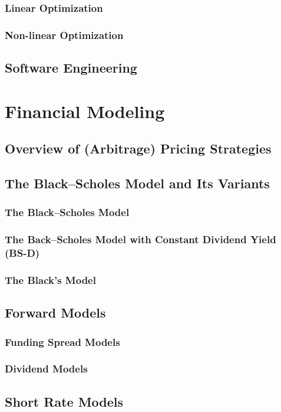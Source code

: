 \subsection{Linear Optimization}
\subsection{Non-linear Optimization}
\section{Software Engineering}

\chapter{Financial Modeling}
\section{Overview of (Arbitrage) Pricing Strategies}
\section{The Black--Scholes Model and Its Variants}
\subsection{The Black--Scholes Model}
\subsection{The Back--Scholes Model with Constant Dividend Yield (BS-D)}
\subsection{The Black's Model}
\section{Forward Models}
\subsection{Funding Spread Models}
\subsection{Dividend Models}
\section{Short Rate Models}
